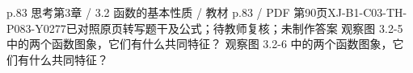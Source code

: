 \par\noindent\begin{minipage}{\linewidth}
\begin{bankitem}{p.83 思考}{第3章 / 3.2 函数的基本性质 / 教材 p.83 / PDF 第90页}{XJ-B1-C03-TH-P083-Y0277}{已对照原页转写题干及公式；待教师复核；未制作答案}
观察图 3.2-5 中的两个函数图象，它们有什么共同特征？
观察图 3.2-6 中的两个函数图象，它们有什么共同特征？
\end{bankitem}
\end{minipage}\par\medskip
